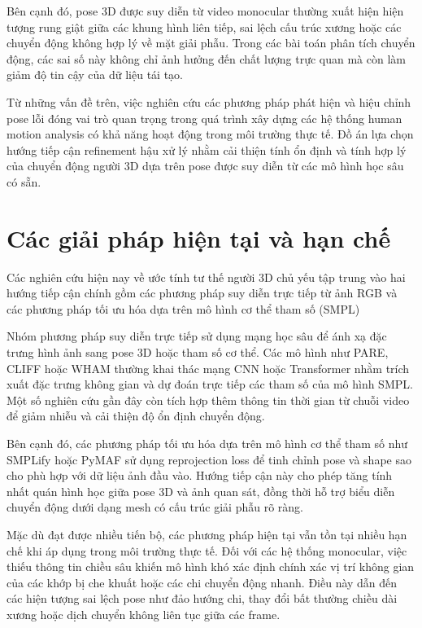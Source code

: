 \documentclass[../DoAn.tex]{subfiles}
\begin{document}
Bên cạnh đó, pose 3D được suy diễn từ video monocular thường xuất hiện hiện tượng rung giật giữa các khung hình liên tiếp, sai lệch cấu trúc xương hoặc các chuyển động không hợp lý về mặt giải phẫu. Trong các bài toán phân tích chuyển động, các sai số này không chỉ ảnh hưởng đến chất lượng trực quan mà còn làm giảm độ tin cậy của dữ liệu tái tạo.

Từ những vấn đề trên, việc nghiên cứu các phương pháp phát hiện và hiệu chỉnh pose lỗi đóng vai trò quan trọng trong quá trình xây dựng các hệ thống human motion analysis có khả năng hoạt động trong môi trường thực tế. Đồ án lựa chọn hướng tiếp cận refinement hậu xử lý nhằm cải thiện tính ổn định và tính hợp lý của chuyển động người 3D dựa trên pose được suy diễn từ các mô hình học sâu có sẵn.

\section{Các giải pháp hiện tại và hạn chế}
\label{sec:giaiphap}

Các nghiên cứu hiện nay về ước tính tư thế người 3D chủ yếu tập trung vào hai hướng tiếp cận chính gồm các phương pháp suy diễn trực tiếp từ ảnh RGB và các phương pháp tối ưu hóa dựa trên mô hình cơ thể tham số (SMPL)

Nhóm phương pháp suy diễn trực tiếp sử dụng mạng học sâu để ánh xạ đặc trưng hình ảnh sang pose 3D hoặc tham số cơ thể. Các mô hình như PARE, CLIFF hoặc WHAM thường khai thác mạng CNN hoặc Transformer nhằm trích xuất đặc trưng không gian và dự đoán trực tiếp các tham số của mô hình SMPL. Một số nghiên cứu gần đây còn tích hợp thêm thông tin thời gian từ chuỗi video để giảm nhiễu và cải thiện độ ổn định chuyển động.

Bên cạnh đó, các phương pháp tối ưu hóa dựa trên mô hình cơ thể tham số như SMPLify hoặc PyMAF sử dụng reprojection loss để tinh chỉnh pose và shape sao cho phù hợp với dữ liệu ảnh đầu vào. Hướng tiếp cận này cho phép tăng tính nhất quán hình học giữa pose 3D và ảnh quan sát, đồng thời hỗ trợ biểu diễn chuyển động dưới dạng mesh có cấu trúc giải phẫu rõ ràng.

Mặc dù đạt được nhiều tiến bộ, các phương pháp hiện tại vẫn tồn tại nhiều hạn chế khi áp dụng trong môi trường thực tế. Đối với các hệ thống monocular, việc thiếu thông tin chiều sâu khiến mô hình khó xác định chính xác vị trí không gian của các khớp bị che khuất hoặc các chi chuyển động nhanh. Điều này dẫn đến các hiện tượng sai lệch pose như đảo hướng chi, thay đổi bất thường chiều dài xương hoặc dịch chuyển không liên tục giữa các frame.
\end{document}
